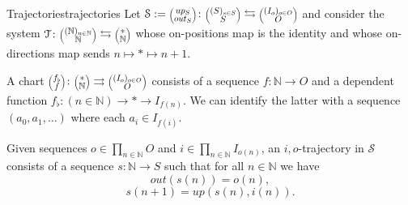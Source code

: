 \documentclass[12pt, a4paper]{article}
\theoremstyle{definition}
\theoremstyle{plain}
\theoremstyle{plain}
\theoremstyle{plain}
\theoremstyle{plain}
\theoremstyle{plain}
\theoremstyle{remark}
\theoremstyle{remark}
\newcommand{\mc}[1]{\mathcal{#1}}
\newcommand{\lens}[2]{\scaleobj{0.6}{\begin{pmatrix} \scaleobj{1.3}{{#1}} \\ \scaleobj{1.3}{{#2}} \end{pmatrix}}}
\begin{document}
\begin{tcdefinition}{Trajectories}{trajectories}
	Let $\mc{S} := \lens{up_S}{out_S} \colon \lens{(S)_{s \in S}}{S} \leftrightarrows \lens{(I_o)_{o \in O}}{O}$ and consider the system $\mc{T} \colon \lens{(\mathbb{N})_{n \in \mathbb{N}}}{\mathbb{N}} \leftrightarrows \lens{*}{\mathbb{N}}$ whose on-positions map is the identity and whose on-directions map sends $n \mapsto * \mapsto n+1$.

	A chart $\lens{f_\flat}{f} \colon \lens{*}{\mathbb{N}} \rightrightarrows \lens{(I_o)_{o \in O}}{O}$ consists of a sequence $f \colon \mathbb{N} \rightarrow O$ and a dependent function $f_\flat \colon (n \in \mathbb{N}) \rightarrow * \rightarrow I_{f(n)}$. We can identify the latter with a sequence $(a_0, a_1, \ldots)$ where each $a_i \in I_{f(i)}$.

	Given sequences $o \in \prod_{n \in \mathbb{N}} O$ and $i \in \prod_{n \in \mathbb{N}} I_{o(n)}$, an $i,o$-trajectory in $\mc{S}$ consists of a sequence $s \colon \mathbb{N} \rightarrow S$ such that for all $n \in \mathbb{N}$ we have
	$$out(s(n)) = o(n), $$
	$$s(n+1) = up(s(n), i(n)).$$
\end{tcdefinition}
\end{document}
